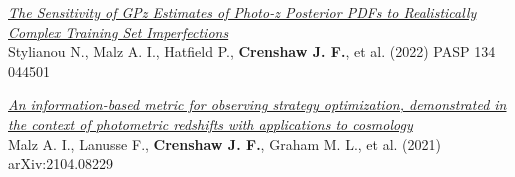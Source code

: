 \begin{etaremune}
\item \href{https://ui.adsabs.harvard.edu/abs/2022PASP..134d4501S}{\textit{The Sensitivity of GPz Estimates of Photo-z Posterior PDFs to Realistically Complex Training Set Imperfections}} \\ 
Stylianou N., Malz A. I., Hatfield P., \textbf{Crenshaw J. F.}, et al. (2022) 
PASP 134 044501 

\item \href{https://ui.adsabs.harvard.edu/abs/2021arXiv210408229M}{\textit{An information-based metric for observing strategy optimization, demonstrated in the context of photometric redshifts with applications to cosmology}} \\ 
Malz A. I., Lanusse F., \textbf{Crenshaw J. F.}, Graham M. L., et al. (2021) 
arXiv:2104.08229 

\end{etaremune}



